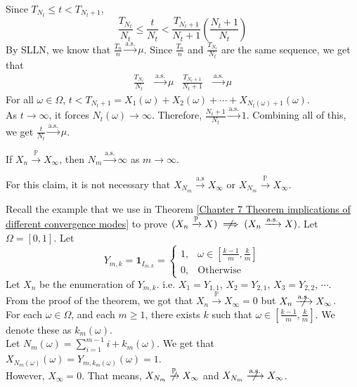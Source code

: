 \documentclass{huhtakm-template-book}
\newcommand{\prob}{\mathbb{P}}
\begin{document}
    \begin{proofing}
        Since $T_{N_{t}}\leq t<T_{N_{t}+1}$,
        \begin{equation*}
            \frac{T_{N_{t}}}{N_{t}}\leq\frac{t}{N_{t}}<\frac{T_{N_{t}+1}}{N_{t}+1}\left(\frac{N_{t}+1}{N_{t}}\right)
        \end{equation*}
        By SLLN, we know that $\frac{T_{n}}{n}\xrightarrow{\text{a.s.}}\mu$. Since $\frac{T_{n}}{n}$ and $\frac{T_{N_{t}}}{N_{t}}$ are the same sequence, we get that
        \begin{align*}
            \frac{T_{N_{t}}}{N_{t}}&\xrightarrow{\text{a.s.}}\mu & \frac{T_{N_{t}+1}}{N_{t}+1}&\xrightarrow{\text{a.s.}}\mu
        \end{align*}
        For all $\omega\in\Omega$, $t<T_{N_{t}+1}=X_{1}(\omega)+X_{2}(\omega)+\cdots+X_{N_{t}(\omega)+1}(\omega)$.\\
        As $t\to\infty$, it forces $N_{t}(\omega)\to\infty$. Therefore, $\frac{N_{t}+1}{N_{t}}\xrightarrow{\text{a.s.}}1$.
        Combining all of this, we get $\frac{t}{N_{t}}\xrightarrow{\text{a.s.}}\mu$.
    \end{proofing}
    \begin{cla}
        If $X_{n}\xrightarrow{\prob}X_{\infty}$, then $N_{m}\xrightarrow{\text{a.s.}}\infty$ as $m\to\infty$.
    \end{cla}
    \begin{rem}
        For this claim, it is not necessary that $X_{N_{m}}\xrightarrow{\text{a.s}}X_{\infty}$ or $X_{N_{m}}\xrightarrow{\prob}X_{\infty}$.
    \end{rem}
    \begin{eg}
        Recall the example that we use in Theorem \ref{Chapter 7 Theorem implications of different convergence modes} to prove $(X_{n}\xrightarrow{\prob}X)\centernot\implies(X_{n}\xrightarrow{\text{a.s.}}X)$. Let $\Omega=[0,1]$. Let
        \begin{equation*}
            Y_{m,k}=\mathbf{1}_{I_{m,k}}=\begin{cases}
                1, &\omega\in\left[\frac{k-1}{m},\frac{k}{m}\right]\\
                0, &\text{Otherwise}
            \end{cases}
        \end{equation*}
        Let $X_{n}$ be the enumeration of $Y_{m,k}$. i.e. $X_{1}=Y_{1,1}$, $X_{2}=Y_{2,1}$, $X_{3}=Y_{2,2}$, $\cdots$.\\
        From the proof of the theorem, we got that $X_{n}\xrightarrow{\prob}X_{\infty}=0$ but $X_{n}\centernot{\xrightarrow{\text{a.s.}}}X_{\infty}$.\\
        For each $\omega\in\Omega$, and each $m\geq 1$, there exists $k$ such that $\omega\in\left[\frac{k-1}{m},\frac{k}{m}\right]$. We denote these as $k_{m}(\omega)$.\\
        Let $N_{m}(\omega)=\sum_{i=1}^{m-1}i+k_{m}(\omega)$. We get that $X_{N_{m}(\omega)}(\omega)=Y_{m,k_{m}(\omega)}(\omega)=1$.\\
        However, $X_{\infty}=0$. That means, $X_{N_{m}}\centernot{\xrightarrow{\prob}}X_{\infty}$ and $X_{N_{m}}\centernot{\xrightarrow{\text{a.s.}}}X_{\infty}$.
    \end{eg}
\end{document}
